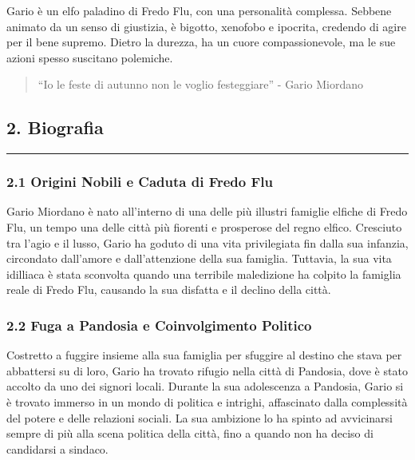 Gario è un elfo paladino di Fredo Flu, con una personalità complessa.
Sebbene animato da un senso di giustizia, è bigotto, xenofobo e
ipocrita, credendo di agire per il bene supremo. Dietro la durezza, ha
un cuore compassionevole, ma le sue azioni spesso suscitano polemiche.

\begin{quote}
``Io le feste di autunno non le voglio festeggiare'' - Gario Miordano
\end{quote}

\subsection{2. Biografia}\label{biografia}

\begin{center}\rule{0.5\linewidth}{0.5pt}\end{center}

\subsubsection{\texorpdfstring{\textbf{2.1 Origini Nobili e Caduta di
Fredo
Flu}}{2.1 Origini Nobili e Caduta di Fredo Flu}}\label{origini-nobili-e-caduta-di-fredo-flu}

Gario Miordano è nato all'interno di una delle più illustri famiglie
elfiche di Fredo Flu, un tempo una delle città più fiorenti e prosperose
del regno elfico. Cresciuto tra l'agio e il lusso, Gario ha goduto di
una vita privilegiata fin dalla sua infanzia, circondato dall'amore e
dall'attenzione della sua famiglia. Tuttavia, la sua vita idilliaca è
stata sconvolta quando una terribile maledizione ha colpito la famiglia
reale di Fredo Flu, causando la sua disfatta e il declino della città.

\subsubsection{\texorpdfstring{\textbf{2.2 Fuga a Pandosia e
Coinvolgimento
Politico}}{2.2 Fuga a Pandosia e Coinvolgimento Politico}}\label{fuga-a-pandosia-e-coinvolgimento-politico}

Costretto a fuggire insieme alla sua famiglia per sfuggire al destino
che stava per abbattersi su di loro, Gario ha trovato rifugio nella
città di Pandosia, dove è stato accolto da uno dei signori locali.
Durante la sua adolescenza a Pandosia, Gario si è trovato immerso in un
mondo di politica e intrighi, affascinato dalla complessità del potere e
delle relazioni sociali. La sua ambizione lo ha spinto ad avvicinarsi
sempre di più alla scena politica della città, fino a quando non ha
deciso di candidarsi a sindaco.

